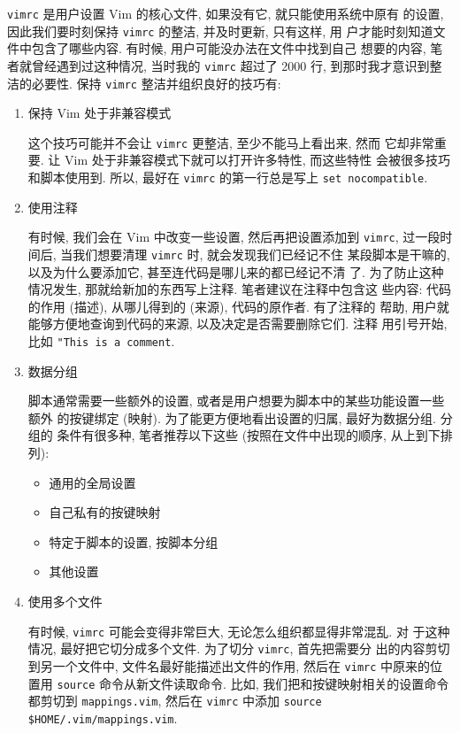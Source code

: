 \texttt{vimrc} 是用户设置 Vim 的核心文件, 如果没有它, 就只能使用系统中原有
的设置, 因此我们要时刻保持 \texttt{vimrc} 的整洁, 并及时更新, 只有这样, 用
户才能时刻知道文件中包含了哪些内容. 有时候, 用户可能没办法在文件中找到自己
想要的内容, 笔者就曾经遇到过这种情况, 当时我的 \texttt{vimrc} 超过了 2000 行,
到那时我才意识到整洁的必要性. 保持 \texttt{vimrc} 整洁并组织良好的技巧有:
\begin{enumerate}
	\item 保持 Vim 处于非兼容模式

	这个技巧可能并不会让 \texttt{vimrc} 更整洁, 至少不能马上看出来, 然而
	它却非常重要. 让 Vim 处于非兼容模式下就可以打开许多特性, 而这些特性
	会被很多技巧和脚本使用到. 所以, 最好在 \texttt{vimrc} 的第一行总是写上
	\texttt{set nocompatible}.
	
	\item 使用注释

	有时候, 我们会在 Vim 中改变一些设置, 然后再把设置添加到 \texttt{vimrc},
	过一段时间后, 当我们想要清理 \texttt{vimrc} 时, 就会发现我们已经记不住
	某段脚本是干嘛的, 以及为什么要添加它, 甚至连代码是哪儿来的都已经记不清
	了. 为了防止这种情况发生, 那就给新加的东西写上注释. 笔者建议在注释中包含这
	些内容: 代码的作用 (描述), 从哪儿得到的 (来源), 代码的原作者. 有了注释的
	帮助, 用户就能够方便地查询到代码的来源, 以及决定是否需要删除它们. 注释
	用引号开始, 比如 \texttt{"This is a comment}.

	\item 数据分组

	脚本通常需要一些额外的设置, 或者是用户想要为脚本中的某些功能设置一些额外
	的按键绑定 (映射). 为了能更方便地看出设置的归属, 最好为数据分组. 分组的
	条件有很多种, 笔者推荐以下这些 (按照在文件中出现的顺序, 从上到下排列):
	\begin{itemize}
	  \item 通用的全局设置
	  \item 自己私有的按键映射
	  \item 特定于脚本的设置, 按脚本分组
	  \item 其他设置
	\end{itemize}

	\item 使用多个文件
	
	有时候, \texttt{vimrc} 可能会变得非常巨大, 无论怎么组织都显得非常混乱. 对
	于这种情况, 最好把它切分成多个文件. 为了切分 \texttt{vimrc}, 首先把需要分
	出的内容剪切到另一个文件中, 文件名最好能描述出文件的作用, 然后在
	\texttt{vimrc} 中原来的位置用 \texttt{source} 命令从新文件读取命令.
	比如, 我们把和按键映射相关的设置命令都剪切到 \texttt{mappings.vim},
	然后在 \texttt{vimrc} 中添加 \texttt{source \$HOME/.vim/mappings.vim}.


\end{enumerate}
